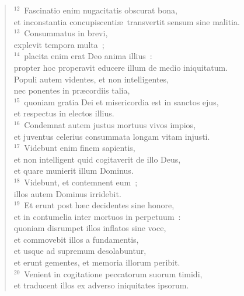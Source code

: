 \begin{flushleft}
\begin{verse}
${}^{12}$~Fascinatio enim nugacitatis obscurat bona,\\ et inconstantia concupiscenti\ae\ transvertit sensum sine malitia.\\
${}^{13}$~Consummatus in brevi,\\ explevit tempora multa~;\\
${}^{14}$~placita enim erat Deo anima illius~:\\ propter hoc properavit educere illum de medio iniquitatum.\\ Populi autem videntes, et non intelligentes,\\ nec ponentes in pr\ae cordiis talia,\\
${}^{15}$~quoniam gratia Dei et misericordia est in sanctos ejus,\\ et respectus in electos illius.\\
${}^{16}$~Condemnat autem justus mortuus vivos impios,\\ et juventus celerius consummata longam vitam injusti.\\
${}^{17}$~Videbunt enim finem sapientis,\\ et non intelligent quid cogitaverit de illo Deus,\\ et quare munierit illum Dominus.\\
${}^{18}$~Videbunt, et contemnent eum~;\\ illos autem Dominus irridebit.\\
${}^{19}$~Et erunt post h\ae c decidentes sine honore,\\ et in contumelia inter mortuos in perpetuum~:\\ quoniam disrumpet illos inflatos sine voce,\\ et commovebit illos a fundamentis,\\ et usque ad supremum desolabuntur,\\ et erunt gementes, et memoria illorum peribit.\\
${}^{20}$~Venient in cogitatione peccatorum suorum timidi,\\ et traducent illos ex adverso iniquitates ipsorum.\end{verse}\end{flushleft}


